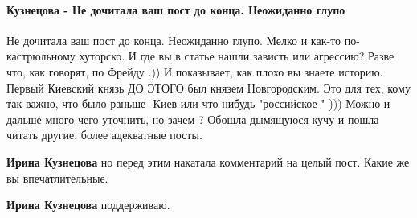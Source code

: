  
 
 
 
 
\paragraph{Кузнецова - Не дочитала ваш пост до конца. Неожиданно глупо}
\label{sec:14_07_2021.fb.krjukova_svetlana.1.statja_putina_mnenie.cmt.kuznecova_ne_dochitala_post}

\begin{itemize}
 

Не дочитала ваш пост до конца. Неожиданно глупо. Мелко и как-то по-кастрюльному
хуторско. И где вы в статье нашли зависть или агрессию? Разве что, как говорят,
по Фрейду .)) И показывает, как плохо вы знаете историю. Первый Киевский князь
ДО ЭТОГО был князем Новгородским. Это для тех, кому так важно, что было раньше
-Киев или что нибудь "российское " ))) Можно и дальше много чего уточнить, но
зачем ? Обошла дымящуюся кучу и пошла читать другие, более адекватные посты.

\begin{itemize}

 
\textbf{Ирина Кузнецова} но перед этим накатала комментарий на целый пост. Какие же вы впечатлительные.

 
\textbf{Ирина Кузнецова} поддерживаю.

 

\end{itemize}
\end{itemize}
